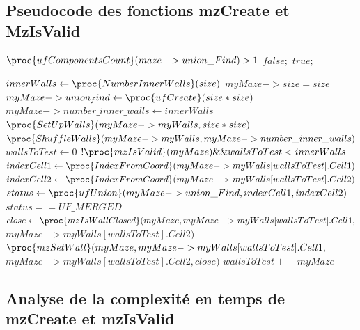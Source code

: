 \documentclass[11pt]{article}
\begin{document}
 

\subsection{Pseudocode des fonctions mzCreate et MzIsValid}

\begin{codebox}
\li    \If $\proc{ufComponentsCount}(maze->union\_Find) > 1$
\li    \Then \Return $false;$
\li    \Else 
\li 		\Return $true;$
\end{codebox}

\begin{codebox}
	\li $innerWalls \gets \proc{NumberInnerWalls}(size)$
	\li $myMaze->size = size$
	\li $myMaze->union_find \gets \proc{ufCreate}(size * size)$
	\li $myMaze->number\_inner\_walls \gets innerWalls$
	\li $\proc{SetUpWalls}(myMaze->myWalls, size*size)$
	\li $\proc{ShuffleWalls}(myMaze->myWalls, myMaze->number\_inner\_walls)$	
	\li $wallsToTest \gets 0$	
	\li \While $!\proc{mzIsValid}(myMaze) \&\& wallsToTest < innerWalls$
	\li \Do $indexCell1 \gets \proc{IndexFromCoord}(myMaze->myWalls[wallsToTest].Cell1)$
	\li 	$indexCell2 \gets \proc{IndexFromCoord}(myMaze->myWalls[wallsToTest].Cell2)$
	\li 	$status \gets \proc{ufUnion}(myMaze->union\_Find, indexCell1, indexCell2)$
	\li 	\If $status == UF\_MERGED$
			\Then
	\li 		$close \gets \proc{mzIsWallClosed}(myMaze, myMaze->myWalls[wallsToTest].Cell1,$ \\$myMaze->myWalls[wallsToTest].Cell2)$
	\li 		$\proc{mzSetWall}(myMaze, myMaze->myWalls[wallsToTest].Cell1,$ \\ $ myMaze->myWalls[wallsToTest].Cell2, close)$
			\End
	\li $wallsToTest++$	
		\End
	\li \Return $myMaze$
\end{codebox}
\subsection{Analyse de la complexité en temps de mzCreate et mzIsValid}
\end{document}
